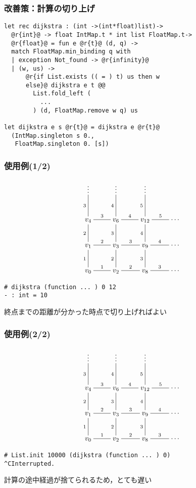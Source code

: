 \documentclass[dvipdfmx,cjk,xcolor=dvipsnames,envcountsect,notheorems,12pt]{beamer}
\theoremstyle{definition}
\begin{document}
\begin{frame}[fragile]
	\frametitle{改善策：計算の切り上げ}
  \begin{lstlisting}
let rec dijkstra : (int ->(int*float)list)->
  @r{int}@ -> float IntMap.t * int list FloatMap.t->
  @r{float}@ = fun e @r{t}@ (d, q) ->
  match FloatMap.min_binding q with
  | exception Not_found -> @r{infinity}@
  | (w, us) ->
      @r{if List.exists (( = ) t) us then w
      else}@ dijkstra e t @@
        List.fold_left (
          ...
        ) (d, FloatMap.remove w q) us

let dijkstra e s @r{t}@ = dijkstra e @r{t}@
  (IntMap.singleton s 0.,
   FloatMap.singleton 0. [s])
\end{lstlisting}
\end{frame}

\begin{frame}[fragile]
	\frametitle{使用例(1/2)}
	\vspace{-7mm}
		\[\xymatrix{
			\vdots & \vdots & \vdots & \\
			v_{4} \ar@{-}[u]^-{3} \ar@{-}[r]^-{3} & v_{6} \ar@{-}[u]^-{4} \ar@{-}[r]^-{4} & v_{12} \ar@{-}[u]^-{5} \ar@{-}[r]^-{5} & \cdots \\
			v_{1} \ar@{-}[u]^-{2} \ar@{-}[r]^-{2} & v_{3} \ar@{-}[u]^-{3} \ar@{-}[r]^-{3} & v_{9} \ar@{-}[u]^-{4} \ar@{-}[r]^-{4} & \cdots \\
			v_{0} \ar@{-}[u]^-{1} \ar@{-}[r]^-{1} & v_{2} \ar@{-}[u]^-{2} \ar@{-}[r]^-{2} & v_{8} \ar@{-}[u]^-{3} \ar@{-}[r]^-{3} & \cdots \\
		} \]
	\vfill
	\begin{lstlisting}
# dijkstra (function ... ) 0 12
- : int = 10
\end{lstlisting}
	\begin{center}
		\large
		終点までの距離が分かった時点で切り上げればよい
	\end{center}
\end{frame}

\begin{frame}[fragile]
	\frametitle{使用例(2/2)}
	\vspace{-7mm}
		\[\xymatrix{
			\vdots & \vdots & \vdots & \\
			v_{4} \ar@{-}[u]^-{3} \ar@{-}[r]^-{3} & v_{6} \ar@{-}[u]^-{4} \ar@{-}[r]^-{4} & v_{12} \ar@{-}[u]^-{5} \ar@{-}[r]^-{5} & \cdots \\
			v_{1} \ar@{-}[u]^-{2} \ar@{-}[r]^-{2} & v_{3} \ar@{-}[u]^-{3} \ar@{-}[r]^-{3} & v_{9} \ar@{-}[u]^-{4} \ar@{-}[r]^-{4} & \cdots \\
			v_{0} \ar@{-}[u]^-{1} \ar@{-}[r]^-{1} & v_{2} \ar@{-}[u]^-{2} \ar@{-}[r]^-{2} & v_{8} \ar@{-}[u]^-{3} \ar@{-}[r]^-{3} & \cdots \\
		} \]
	\vfill
	\begin{lstlisting}
# List.init 10000 (dijkstra (function ... ) 0)
^CInterrupted.
\end{lstlisting}
	\begin{center}
		\large
		計算の途中経過が捨てられるため，とても遅い
	\end{center}
\end{frame}
\end{document}
